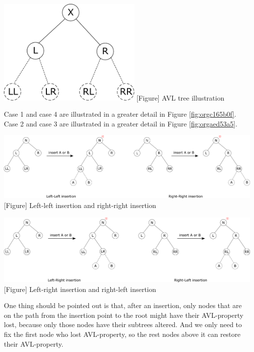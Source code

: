 \documentclass[11pt]{book}
\begin{document}
\begin{center}
\includegraphics[width=200pt]{./img/AVL-illustration.pdf}
[Figure]{\label{fig:org96450ae}
AVL tree illustration}
\end{center}

Case 1 and case 4 are illustrated in a greater detail in Figure \ref{fig:orgc165b0f}. Case 2 and case 3 are illustrated in a greater detail in Figure \ref{fig:orgaed53a5}.

\begin{center}
\includegraphics[width=500pt]{./img/AVL-LL-RR-insertion.pdf}
[Figure]{\label{fig:orgc165b0f}
Left-left insertion and right-right insertion}
\end{center}

\begin{center}
\includegraphics[width=500pt]{./img/AVL-LR-RL-insertion.pdf}
[Figure]{\label{fig:orgaed53a5}
Left-right insertion and right-left insertion}
\end{center}

One thing should be pointed out is that, after an insertion, only nodes that are on the path from the insertion point to the root might have their AVL-property lost, because only those nodes have their subtrees altered. And we only need to fix the first node who lost AVL-property, so the rest nodes above it can restore their AVL-property.
\end{document}
